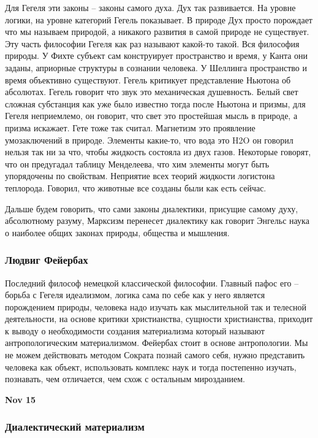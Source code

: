 \documentclass[a4paper, 12pt]{article}
\begin{document}
Для Гегеля эти законы -- законы самого духа. Дух так развивается. На 
уровне логики, на уровне категорий Гегель показывает. В природе Дух 
просто порождает что мы называем природой, а никакого развития в самой 
природе не существует. Эту часть философии Гегеля как раз называют 
какой-то такой. Вся философия природы. У Фихте субъект сам конструирует 
пространство и время, у Канта они заданы, априорные структуры в сознании 
человека. У Шеллинга пространство и время объективно существуют. Гегель 
критикует представление Ньютона об абсолютах. Гегель говорит что звук 
это механическая душевность. Белый свет сложная субстанция как уже было 
известно тогда после Ньютона и призмы, для Гегеля неприемлемо, он 
говорит, что свет это простейшая мысль в природе, а призма искажает. 
Гете тоже так считал. Магнетизм это проявление умозаключений в природе. 
Элементы какие-то, что вода это H2O он говорил нельзя так ни за что, 
чтобы жидкость состояла из двух газов. Некоторые говорят, что он 
предугадал таблицу Менделеева, что хим элементы могут быть упорядочены 
по свойствам. Неприятие всех теорий жидкости логистона теплорода. 
Говорил, что животные все созданы были как есть сейчас.

Дальше будем говорить, что сами законы диалектики, присущие самому духу, 
абсолютному разуму, Марксизм перенесет диалектику как говорит Энгельс 
наука о наиболее общих законах природы, общества и мышления.


\subsubsection{Людвиг Фейербах}

Последний философ немецкой классической философии. Главный пафос его -- 
борьба с Гегеля идеализмом, логика сама по себе как у него является 
порождением природы, человека надо изучать как мыслительной так 
и телесной деятельности, на основе критики христианства, сущности 
христианства, приходит к выводу о необходимости создания материализма 
который называют антропологическим материализмом. Фейербах стоит 
в основе антропологии. Мы не можем действовать методом Сократа познай 
самого себя, нужно представить человека как объект, использовать 
комплекс наук и тогда постепенно изучать, познавать, чем отличается, чем 
схож с остальным мирозданием.

\hfill\textbf{Nov 15}


\subsubsection{Диалектический материализм}
\end{document}
